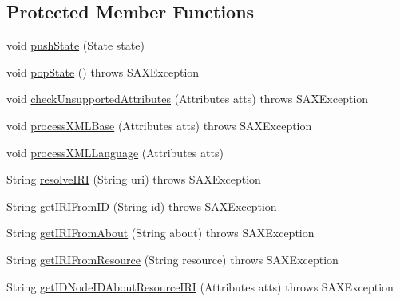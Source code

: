 \subsection*{Protected Member Functions}
\begin{DoxyCompactItemize}
\item 
void \hyperlink{classorg_1_1semanticweb_1_1owlapi_1_1rdf_1_1syntax_1_1_r_d_f_parser_a8667905eb6d5a4f4a2c916f0112078e8}{push\-State} (State state)
\item 
void \hyperlink{classorg_1_1semanticweb_1_1owlapi_1_1rdf_1_1syntax_1_1_r_d_f_parser_ab581bdbde3c8905920a54a830559ef49}{pop\-State} ()  throws S\-A\-X\-Exception 
\item 
void \hyperlink{classorg_1_1semanticweb_1_1owlapi_1_1rdf_1_1syntax_1_1_r_d_f_parser_ab86cf76f7ad338480c675da299d1d8d1}{check\-Unsupported\-Attributes} (Attributes atts)  throws S\-A\-X\-Exception 
\item 
void \hyperlink{classorg_1_1semanticweb_1_1owlapi_1_1rdf_1_1syntax_1_1_r_d_f_parser_a9e9ba398717e852f30aedcd236695e7b}{process\-X\-M\-L\-Base} (Attributes atts)  throws S\-A\-X\-Exception 
\item 
void \hyperlink{classorg_1_1semanticweb_1_1owlapi_1_1rdf_1_1syntax_1_1_r_d_f_parser_aad10a158e2b7500a3f5cc656086b6414}{process\-X\-M\-L\-Language} (Attributes atts)
\item 
String \hyperlink{classorg_1_1semanticweb_1_1owlapi_1_1rdf_1_1syntax_1_1_r_d_f_parser_ad1201bf5f7690e43d7e975816d80cda7}{resolve\-I\-R\-I} (String uri)  throws S\-A\-X\-Exception 
\item 
String \hyperlink{classorg_1_1semanticweb_1_1owlapi_1_1rdf_1_1syntax_1_1_r_d_f_parser_a22db2f9c58e4021b8ea51c57ae61a027}{get\-I\-R\-I\-From\-I\-D} (String id)  throws S\-A\-X\-Exception 
\item 
String \hyperlink{classorg_1_1semanticweb_1_1owlapi_1_1rdf_1_1syntax_1_1_r_d_f_parser_a95a656748f9e8915ab81339ff16bc080}{get\-I\-R\-I\-From\-About} (String about)  throws S\-A\-X\-Exception 
\item 
String \hyperlink{classorg_1_1semanticweb_1_1owlapi_1_1rdf_1_1syntax_1_1_r_d_f_parser_a19a63d578bb6cf5b4b21505b83f33740}{get\-I\-R\-I\-From\-Resource} (String resource)  throws S\-A\-X\-Exception 
\item 
String \hyperlink{classorg_1_1semanticweb_1_1owlapi_1_1rdf_1_1syntax_1_1_r_d_f_parser_a8c4adfa6578dd73c14d3a2f9a719241c}{get\-I\-D\-Node\-I\-D\-About\-Resource\-I\-R\-I} (Attributes atts)  throws S\-A\-X\-Exception 
\item 

\end{DoxyCompactItemize}
